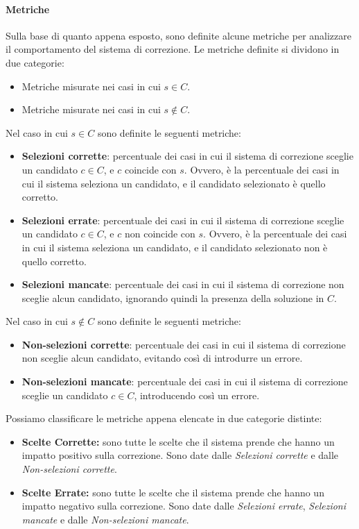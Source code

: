 \paragraph{Metriche}
Sulla base di quanto appena esposto, sono definite alcune metriche per analizzare il comportamento del sistema di correzione. Le metriche definite si dividono in due categorie:
\begin{itemize}
\item Metriche misurate nei casi in cui $s \in C$.
\item Metriche misurate nei casi in cui $s \not\in C$.
\end{itemize}
Nel caso in cui $s \in C$ sono definite le seguenti metriche:
\begin{itemize}
\item \textbf{Selezioni corrette}: percentuale dei casi in cui il sistema di correzione sceglie un candidato $c \in C$, e $c$ coincide con $s$. Ovvero, è la percentuale dei casi in cui il sistema seleziona un candidato, e il candidato selezionato è quello corretto.

\item \textbf{Selezioni errate}: percentuale dei casi in cui il sistema di correzione sceglie un candidato $c \in C$, e $c$ non coincide con $s$. Ovvero, è la percentuale dei casi in cui il sistema seleziona un candidato, e il candidato selezionato non è quello corretto.

\item \textbf{Selezioni mancate}: percentuale dei casi in cui il sistema di correzione non sceglie alcun candidato, ignorando quindi la presenza della soluzione in $C$.

\end{itemize}

\noindent
Nel caso in cui $s \not\in C$ sono definite le seguenti metriche:
\begin{itemize}
\item \textbf{Non-selezioni corrette}: percentuale dei casi in cui il sistema di correzione non sceglie alcun candidato, evitando così di introdurre un errore.

\item \textbf{Non-selezioni mancate}: percentuale dei casi in cui il sistema di correzione sceglie un candidato $c\in C$, introducendo così un errore.
\end{itemize}

\noindent
Possiamo classificare le metriche appena elencate in due categorie distinte:
\begin{itemize}
\item \textbf{Scelte Corrette:} sono tutte le scelte che il sistema prende che hanno un impatto positivo sulla correzione. Sono date dalle \textit{Selezioni corrette} e dalle \textit{Non-selezioni corrette}.

\item \textbf{Scelte Errate:} sono tutte le scelte che il sistema prende che hanno un impatto negativo sulla correzione. Sono date dalle \textit{Selezioni errate}, \textit{Selezioni mancate} e dalle \textit{Non-selezioni mancate}.
\end{itemize}

